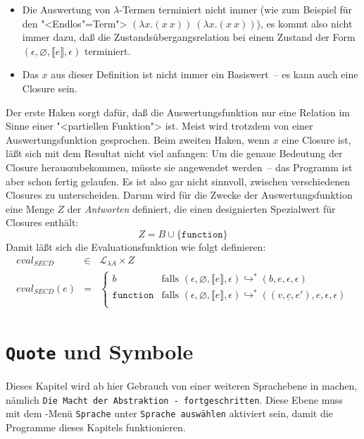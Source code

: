 %
\begin{itemize}
\item Die Auswertung von $\lambda$-Termen terminiert nicht immer (wie
  zum Beispiel für den "<Endlos"=Term"> $(\lambda x.(x~x))~(\lambda x.(x~x))$), es kommt
  also nicht immer dazu, daß die Zustandsübergangsrelation bei einem
  Zustand der Form $(\epsilon, \varnothing, \llbracket e\rrbracket,
  \epsilon)$ terminiert.
\item Das $x$ aus dieser Definition ist nicht immer ein Basiswert~--
  es kann auch eine Closure sein.
\end{itemize}
%
Der erste Haken sorgt dafür, daß die Auswertungsfunktion nur eine
Relation im Sinne einer "<partiellen Funktion"> ist.  Meist wird
trotzdem von einer Auswertungsfunktion gesprochen.  Beim zweiten
Haken, wenn $x$ eine Closure ist, läßt sich mit dem Resultat nicht
viel anfangen: Um die genaue Bedeutung der Closure herauszubekommen,
müsste sie angewendet werden~-- das Programm ist aber schon fertig
gelaufen.  Es ist also gar nicht sinnvoll, zwischen verschiedenen
Closures zu unterscheiden.  Darum wird für die Zwecke der
Auswertungsfunktion eine Menge $Z$ der \textit{Antworten}
definiert, die einen designierten Spezialwert für Closures enthält:
%
\begin{displaymath}
  Z = B \cup \{ \texttt{function} \}
\end{displaymath}
%
Damit läßt sich die Evaluationsfunktion wie folgt definieren:
%
\begin{eqnarray*}
  \mathit{eval}_\mathit{SECD} & \in & \mathcal{L}_{\lambda{}A} \times Z\\
  \mathit{eval}_\mathit{SECD}(e) & = &
  \begin{cases}
    b & \textrm{falls } (\epsilon, \varnothing, \llbracket e\rrbracket, \epsilon)
    \hookrightarrow^* (b, e, \epsilon, \epsilon)\\
    \texttt{function} & \textrm{falls } (\epsilon, \varnothing, \llbracket e\rrbracket, \epsilon)
    \hookrightarrow^* ((v, \underline{c}, e'), e, \epsilon, \epsilon)\\
  \end{cases}
\end{eqnarray*}

\section{\texttt{Quote} und Symbole}
\label{sec:quote}

Dieses Kapitel wird ab hier Gebrauch von einer weiteren
Sprachebene in
\drscheme{} machen, nämlich \texttt{Die Macht der Abstraktion -
  fortgeschritten}.  Diese Ebene muss mit dem \drscheme{}-Menü \texttt{Sprache}
unter \texttt{Sprache auswählen} aktiviert sein, damit die
Programme dieses Kapitels funktionieren.

